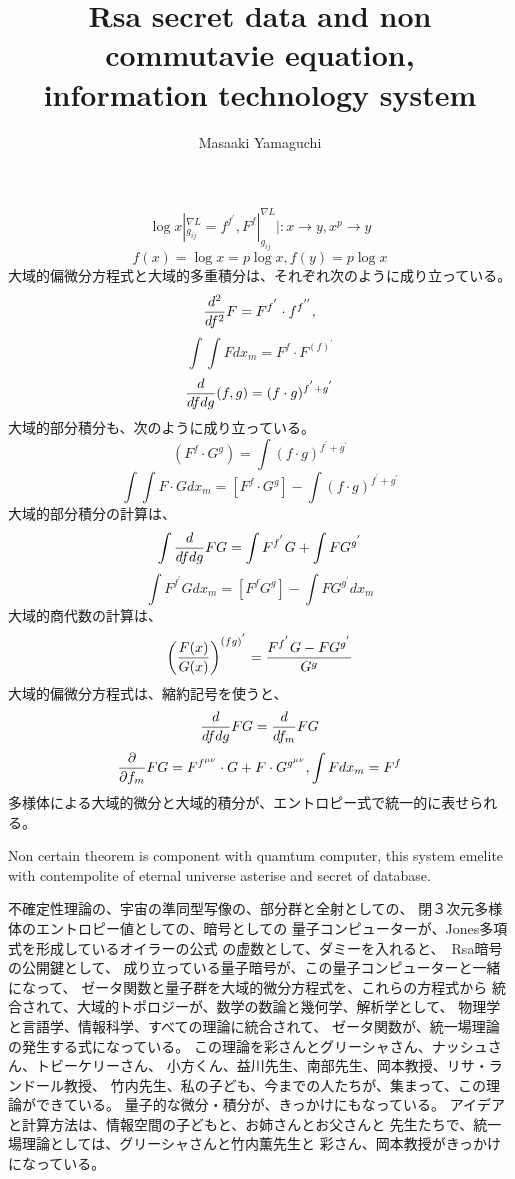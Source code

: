 \documentclass{jsarticle}
\begin{document}
  $$ \log x|_{g_{ij}}^{\nabla L} = f^{f^{'}}, F^f|_{g_{ij}}^{\nabla L}
  |: x \to y, x^p \to y $$ 
  $$  f(x) = \log x = p \log x, f(y) = p \log x  $$
  大域的偏微分方程式と大域的多重積分は、それぞれ次のように成り立っている。
  $$ {d^2 \over df^2}F = F^{f^{'}}\cdot f^{f^{''}},  $$
  $$ \int \int F dx_m = F^f \cdot F^{(f)^{'}} $$
  $$ {d \over df dg}(f,g) = (f \cdot g)^{f^{'} + g^{'}} $$
  大域的部分積分も、次のように成り立っている。
  $$ (F^f \cdot G^g) = \int (f \cdot g)^{f^{'} + g^{'}} $$
  $$ \int \int F\cdot G dx_m = [F^f \cdot G^g] - 
  \int (f \cdot g)^{f^{'} + g^{'}} $$
  大域的部分積分の計算は、
  $$ \int {d \over {df dg}}FG = \int F^{f^{'}}G + \int F G^{g^{'}} $$
  $$ \int F^{f^{'}}Gdx_m = [F^f G^g] - \int F G^{g^{'}}dx_m$$
  大域的商代数の計算は、
  $$ \left({F(x) \over G(x)}\right)^{(fg)^{'}} = {F^{f^{'}}G - FG^{g^{'}}
  \over G^{g}} $$
  大域的偏微分方程式は、縮約記号を使うと、
  $$ {d \over df dg}FG = {d \over df_m}FG $$
  $$ {\partial \over \partial f_m}FG = F^{f^{\mu\nu}}\cdot G
  + F \cdot G^{g^{\mu\nu}}, \int F dx_m = F^f $$
  多様体による大域的微分と大域的積分が、エントロピー式で統一的に表せられる。

\newpage
\title{Rsa secret data and non commutavie equation, \\
information technology system}
\author{Masaaki Yamaguchi}

      Non certain theorem is component with quamtum computer, this system
   emelite with contempolite of eternal universe asterise and
   secret of database.

   不確定性理論の、宇宙の準同型写像の、部分群と全射としての、
   閉３次元多様体のエントロピー値としての、暗号としての
   量子コンピューターが、Jones多項式を形成しているオイラーの公式
   の虚数として、ダミーを入れると、　Rsa暗号の公開鍵として、
   成り立っている量子暗号が、この量子コンピューターと一緒になって、
   ゼータ関数と量子群を大域的微分方程式を、これらの方程式から
   統合されて、大域的トポロジーが、数学の数論と幾何学、解析学として、
   物理学と言語学、情報科学、すべての理論に統合されて、
   ゼータ関数が、統一場理論の発生する式になっている。
   この理論を彩さんとグリーシャさん、ナッシュさん、トビーケリーさん、
   小方くん、益川先生、南部先生、岡本教授、リサ・ランドール教授、
   竹内先生、私の子ども、今までの人たちが、集まって、この理論ができている。
   量子的な微分・積分が、きっかけにもなっている。
   アイデアと計算方法は、情報空間の子どもと、お姉さんとお父さんと
   先生たちで、統一場理論としては、グリーシャさんと竹内薫先生と
   彩さん、岡本教授がきっかけになっている。
\end{document}
